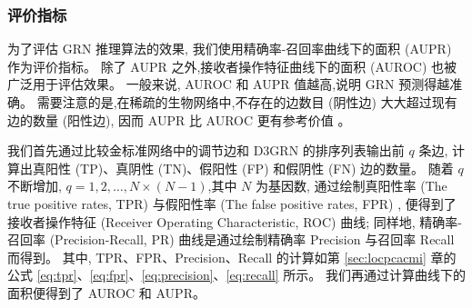 \begin{table}[!htbp]
\centering
\caption{实验数据集详情}

\label{datasets}
\end{table}

\subsubsection{评价指标}

为了评估 GRN 推理算法的效果, 我们使用精确率-召回率曲线下的面积 (AUPR) 作为评价指标。
除了 AUPR 之外,接收者操作特征曲线下的面积 (AUROC) 也被广泛用于评估效果。
一般来说, AUROC 和 AUPR 值越高,说明 GRN 预测得越准确。
需要注意的是,在稀疏的生物网络中,不存在的边数目 (阴性边) 大大超过现有边的数量 (阳性边),
因而 AUPR 比 AUROC 更有参考价值 \cite{saito2015precision} 。

我们首先通过比较金标准网络中的调节边和 D3GRN 的排序列表输出前 $q$ 条边,
计算出真阳性 (TP)、真阴性 (TN)、假阳性 (FP) 和假阴性 (FN) 边的数量。
随着 $q$ 不断增加, $q = 1,2,\ldots,N\times(N-1)$,其中 $N$ 为基因数,
通过绘制真阳性率 (The true positive rates, TPR) 与假阳性率 (The false positive rates, FPR) ,
便得到了接收者操作特征 (Receiver Operating Characteristic, ROC) 曲线; 
同样地,
精确率-召回率 (Precision-Recall, PR) 曲线是通过绘制精确率 Precision 与召回率 Recall 而得到。
其中, TPR、FPR、Precision、Recall 的计算如第 \ref{sec:locpcacmi} 章的公式 \ref{eq:tpr}、\ref{eq:fpr}、\ref{eq:precision}、\ref{eq:recall} 所示。
我们再通过计算曲线下的面积便得到了 AUROC 和 AUPR。

